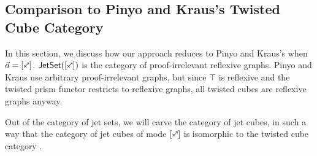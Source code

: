 \documentclass[a4paper]{article}
\begin{document}
\subsection{Comparison to Pinyo and Kraus's Twisted Cube Category}
In this section, we discuss how our approach reduces to Pinyo and Kraus's \cite{pinyo-twisted} when $\vec a = [\ypolar]$.
$\jetset{[\ypolar]}$ is the category of proof-irrelevant reflexive graphs.
Pinyo and Kraus use arbitrary proof-irrelevant graphs, but since $\top$ is reflexive and the twisted prism functor \cite[def.\ 4]{pinyo-twisted} restricts to reflexive graphs, all twisted cubes are reflexive graphs anyway.


Out of the category of jet sets, we will carve the category of jet cubes, in such a way that the category of jet cubes of mode $[\ypolar]$ is isomorphic to the twisted cube category \cite{pinyo-twisted}.




\end{document}
